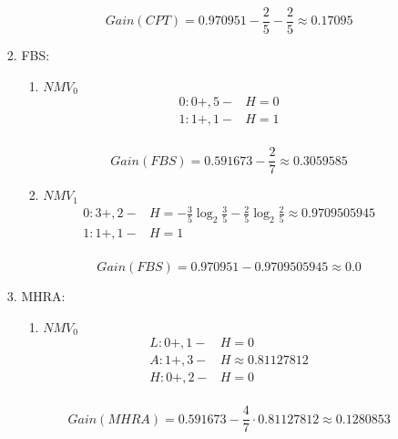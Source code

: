 \begin{enumerate}
\begin{enumerate}
\begin{enumerate}
\begin{enumerate}
							\[
								Gain(CPT) = 0.970951 - \frac{2}{5} - \frac{2}{5} \approx 0.17095
							\]
							
						\end{enumerate}

					\item{FBS:} \\
						
						\begin{enumerate}
						
							\item{\(NMV_0\)}
							\[
								\begin{array}{l|l}
									0: 0+, 5- & H= 0 \\
									1: 1+, 1- & H= 1 \\
								\end{array}
							\] 
							
							\[
								Gain(FBS) = 0.591673 - \frac{2}{7} \approx 0.3059585
							\]
							
							\item{\(NMV_1\)}
							\[
								\begin{array}{l|l}
									0: 3+, 2- & H= - \frac{3}{5} \log_2 \frac{3}{5} - \frac{2}{5} \log_2 \frac{2}{5} \approx 0.9709505945  \\
									1: 1+, 1- & H= 1 \\
								\end{array}
							\] 
							
							\[
								Gain(FBS) = 0.970951 - 0.9709505945 \approx 0.0
							\]
							
						\end{enumerate}
					
					\item{MHRA:} \\
						
						\begin{enumerate}
						
							\item{\(NMV_0\)}
							\[
								\begin{array}{l|l}
									L: 0+, 1- & H= 0 \\
									A: 1+, 3- & H \approx 0.81127812 \\
									H: 0+, 2- & H= 0 \\
								\end{array}
							\] 
							
							\[
								Gain(MHRA) = 0.591673 - \frac{4}{7} \cdot 0.81127812 \approx 0.1280853
							\]
							

\end{enumerate}
\end{enumerate}
\end{enumerate}
\end{enumerate}
